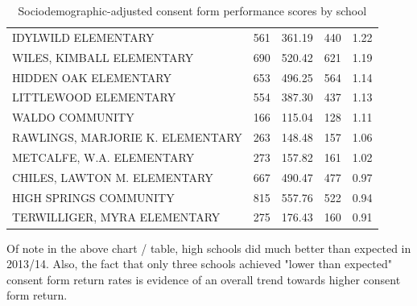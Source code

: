 \begin{table}[H]
\begin{table}[ht]
{\begin{tabular}{lrrrr}
  IDYLWILD ELEMENTARY & 561 & 361.19 & 440 & 1.22 \\ 
  WILES, KIMBALL ELEMENTARY & 690 & 520.42 & 621 & 1.19 \\ 
  HIDDEN OAK ELEMENTARY & 653 & 496.25 & 564 & 1.14 \\ 
  LITTLEWOOD ELEMENTARY & 554 & 387.30 & 437 & 1.13 \\ 
  WALDO COMMUNITY  & 166 & 115.04 & 128 & 1.11 \\ 
  RAWLINGS, MARJORIE K. ELEMENTARY & 263 & 148.48 & 157 & 1.06 \\ 
  METCALFE, W.A. ELEMENTARY & 273 & 157.82 & 161 & 1.02 \\ 
  CHILES, LAWTON M. ELEMENTARY & 667 & 490.47 & 477 & 0.97 \\ 
  HIGH SPRINGS COMMUNITY  & 815 & 557.76 & 522 & 0.94 \\ 
  TERWILLIGER, MYRA ELEMENTARY & 275 & 176.43 & 160 & 0.91 \\ 
   \hline
\end{tabular}
}
\caption{Sociodemographic-adjusted consent form performance scores by school} 
\end{table}\end{table}

Of note in the above chart / table, high schools did much better than expected in 2013/14.  Also, the fact that only three schools achieved "lower than expected" consent form return rates is evidence of an overall trend towards higher consent form return.

\begin{center}
\end{center}


